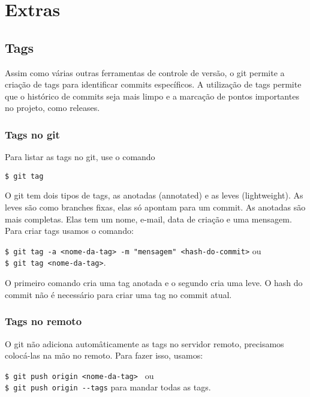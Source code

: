 \documentclass{article}
\begin{document}
\section{Extras}
\subsection{Tags}
    Assim como várias outras ferramentas de controle de versão, o git permite a criação de tags para
identificar commits específicos. A utilização de tags permite que o histórico de commits seja mais limpo
e a marcação de pontos importantes no projeto, como releases.

\subsubsection{Tags no git}
    Para listar as tags no git, use o comando
    \begin{tabbing}
        \hspace{1cm}\=\verb#$ git tag#
    \end{tabbing}
    
    O git tem dois tipos de tags, as anotadas (annotated) e as leves (lightweight). As leves
são como branches fixas, elas só apontam para um commit. As anotadas são mais completas. Elas
tem um nome, e-mail, data de criação e uma mensagem. Para criar tags usamos o comando:
    \begin{tabbing}
        \hspace{1cm}\=\verb#$ git tag -a <nome-da-tag> -m "mensagem" <hash-do-commit># ou \\
                    \>\verb#$ git tag <nome-da-tag>#.
    \end{tabbing}
        O primeiro comando cria uma tag anotada e o segundo cria uma leve. O hash do commit não é necessário
para criar uma tag no commit atual.
\subsubsection{Tags no remoto}
    O git não adiciona automâticamente as tags no servidor remoto, precisamos colocá-las na mão
no remoto. Para fazer isso, usamos:
    \begin{tabbing}
        \hspace{1cm}\=\verb#$ git push origin <nome-da-tag> # ou \\
                    \>\verb#$ git push origin --tags# para mandar todas as tags.
    \end{tabbing}
\end{document}
